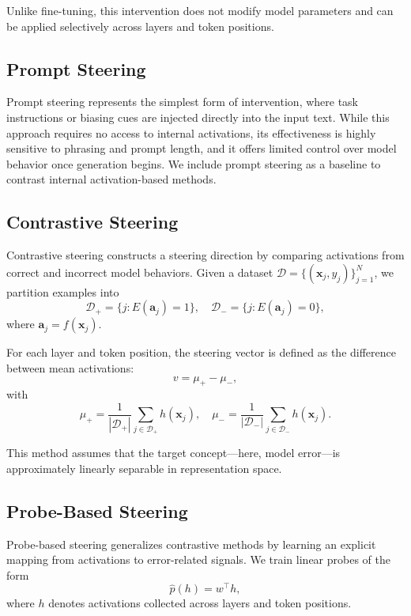 \documentclass[sigconf]{acmart}
\begin{document}
Unlike fine-tuning, this intervention does not modify model parameters and can be applied selectively across layers and token positions.

\subsection{Prompt Steering}

Prompt steering represents the simplest form of intervention, where task instructions or biasing cues are injected directly into the input text. While this approach requires no access to internal activations, its effectiveness is highly sensitive to phrasing and prompt length, and it offers limited control over model behavior once generation begins. We include prompt steering as a baseline to contrast internal activation-based methods.

\subsection{Contrastive Steering}

Contrastive steering constructs a steering direction by comparing activations from correct and incorrect model behaviors. Given a dataset $\mathcal{D} = \{(\mathbf{x}_j, y_j)\}_{j=1}^N$, we partition examples into
\[
\mathcal{D}_+ = \{j : E(\mathbf{a}_j)=1\}, \quad
\mathcal{D}_- = \{j : E(\mathbf{a}_j)=0\},
\]
where $\mathbf{a}_j = f(\mathbf{x}_j)$.

For each layer and token position, the steering vector is defined as the difference between mean activations:
\begin{equation}
v = \mu_+ - \mu_-,
\end{equation}
with
\[
\mu_+ = \frac{1}{|\mathcal{D}_+|}\sum_{j\in\mathcal{D}_+} h(\mathbf{x}_j), \quad
\mu_- = \frac{1}{|\mathcal{D}_-|}\sum_{j\in\mathcal{D}_-} h(\mathbf{x}_j).
\]

This method assumes that the target concept—here, model error—is approximately linearly separable in representation space.

\subsection{Probe-Based Steering}

Probe-based steering generalizes contrastive methods by learning an explicit mapping from activations to error-related signals. We train linear probes of the form
\begin{equation}
\hat{p}(h) = w^\top h,
\end{equation}
where $h$ denotes activations collected across layers and token positions.
\end{document}
